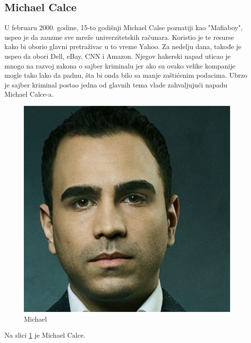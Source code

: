 \documentclass[a4paper]{article}
\begin{document}
\subsection{Michael Calce}
U februaru 2000. godine, 15-to godišnji Michael Calse poznatiji kao "Mafiaboy", uspeo je da zauzme sve mreže univerzitetskih računara. Koristio je te resurse kako bi oborio glavni pretraživac u to vreme Yahoo. Za nedelju dana, takođe je uspeo da obori Dell, eBay, CNN i Amazon. Njegov hakerski napad uticao je mnogo na razvoj zakona o sajber kriminalu jer ako su ovako velike kompanije mogle tako lako da padnu, šta bi onda bilo sa manje zaštićenim podacima. Ubrzo je sajber kriminal postao jedna od glavnih tema vlade zahvaljujući napadu Michael Calce-a.
\begin{figure}[h!]
	\begin{center}
		\includegraphics[scale=0.10]{michael.jpg}
	\end{center}
	\caption{Michael}
	\label{fig:michael}
\end{figure}

Na slici \ref{fig:michael} je Michael Calce.
\end{document}
